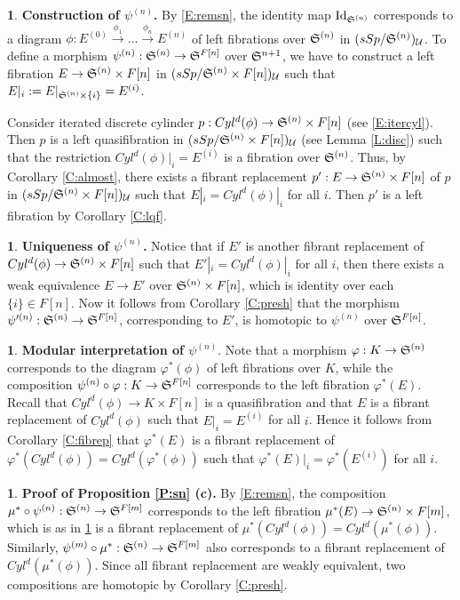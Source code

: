 \documentclass[12pt]{amsart}
\theoremstyle{plain}
\theoremstyle{definition}
\newtheorem{Emp}[Thm]{}
\numberwithin{equation}{section}
\newcommand{\cal}[1]{\mathcal{#1}}
\newcommand{\C}[1]{\cal#1}
\newcommand{\lra}{\longrightarrow}
\newcommand{\rl}[1]{Lemma \ref{L:#1}}
\newcommand{\rp}[1]{Proposition \ref{P:#1}}
\newcommand{\re}[1]{\ref{E:#1}}
\newcommand{\rco}[1]{Corollary \ref{C:#1}}
\newcommand{\Id}{\operatorname{Id}}
\renewcommand{\S}{\frak{S}}
\begin{document}
\begin{Emp} \label{E:step1}
{\bf Construction of $\psi^{(n)}$.} By \re{remsn}, the identity
map $\Id_{\S^{(n)}}$ corresponds to a diagram
$\phi:E^{(0)}\overset{\phi_1}{\lra} \ldots \overset{\phi_n}{\lra}
E^{(n)}$ of left fibrations over $\S^{(n)}$ in $(sSp/\S^{(n)})_{\C{U}}$. To
define a morphism $\psi^{(n)}:\S^{(n)}\to \S^{F[n]}$ over
$\S^{n+1}$, we have to construct a left fibration $E\to
\S^{(n)}\times F[n]$ in $(sSp/\S^{(n)}\times F[n])_{\C{U}}$ such
that $E|_i:=E|_{\S^{(n)}\times\{i\}}=E^{(i)}$.

Consider iterated discrete cylinder $p:Cyl^d(\phi)\to
\S^{(n)}\times F[n]$ (see \re{itercyl}). Then $p$ is a left
quasifibration in $(sSp/\S^{(n)}\times F[n])_{\C{U}}$ (see
\rl{disc}) such that the restriction $Cyl^d(\phi)|_i=E^{(i)}$ is a
fibration over $\S^{(n)}$. Thus, by \rco{almost}, there exists a
fibrant replacement $p':E\to \S^{(n)}\times F[n]$ of $p$ in
$(sSp/\S^{(n)}\times F[n])_{\C{U}}$ such that $E|_i=
Cyl^d(\phi)|_i$ for all $i$. Then $p'$ is a left fibration 
by \rco{lqf}.
\end{Emp}

\begin{Emp} \label{E:step1'}
{\bf Uniqueness of $\psi^{(n)}$.} Notice that if $E'$ is another
fibrant replacement of $Cyl^d(\phi)\to \S^{(n)}\times F[n]$ such
that $E'|_i= Cyl^d(\phi)|_i$ for all $i$, then there exists a weak
equivalence $E\to E'$ over $\S^{(n)}\times F[n]$, which is
identity over each $\{i\}\in F[n]$. Now it follows from
\rco{presh} that the morphism $\psi'^{(n)}:\S^{(n)}\to
\S^{F[n]}$, corresponding to $E'$, is homotopic to $\psi^{(n)}$
over $\S^{F[n]}$.
\end{Emp}

\begin{Emp} \label{E:step2}
{\bf Modular interpretation of $\psi^{(n)}$}. Note that a morphism
$\varphi:K\to \S^{(n)}$ corresponds to the diagram
$\varphi^*(\phi)$ of left fibrations over $K$, while the
composition $\psi^{(n)}\circ \varphi:K\to \S^{F[n]}$ corresponds
to the left fibration $\varphi^*(E)$. Recall that $Cyl^d(\phi)\to
K\times F[n]$ is a quasifibration and that $E$ is a fibrant
replacement of $Cyl^d(\phi)$ such that $E|_i=E^{(i)}$ for all $i$.
Hence it follows from \rco{fibrep} that $\varphi^*(E)$ is a
fibrant replacement of
$\varphi^*(Cyl^d(\phi))=Cyl^d(\varphi^*(\phi))$ such that
$\varphi^*(E)|_i=\varphi^*(E^{(i)})$ for all $i$.
\end{Emp}

\begin{Emp} \label{E:pfsnc}
{\bf Proof of \rp{sn} (c).} By \re{remsn}, the composition 
$\mu^*\circ \psi^{(n)}:\S^{(n)}\to \S^{F[m]}$ corresponds to the left fibration
$\mu^*(E)\to \S^{(n)}\times F[m]$, which is as in \re{step2} is a fibrant 
replacement of $\mu^*(Cyl^d(\phi))=Cyl^d(\mu^*(\phi))$. Similarly, $\psi^{(m)}\circ\mu^*:\S^{(n)}\to \S^{F[m]}$
also corresponds to a fibrant replacement of $Cyl^d(\mu^*(\phi))$. Since all fibrant
replacement are weakly equivalent, two compositions are homotopic
by \rco{presh}.
\end{Emp}
\end{document}
